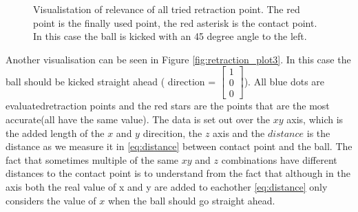 \documentclass[a4paper]{article}
\begin{document}
\begin{figure}[htbp]
  \centering
  \caption{Visualistation of relevance of all tried retraction point. The red
      point is the finally used point, the red asterisk is the contact point. 
      In this case the ball is kicked with an 45 degree angle to the left.
         }
  \label{fig:retraction_plot2}
\end{figure}

Another visualisation can be seen in Figure  \ref{fig:retraction_plot3}. In this
case the ball should be kicked straight ahead ( direction = $\begin{bmatrix} 1 \\  0 \\ 0 \end{bmatrix}$). All blue dots are evaluatedretraction points and the red stars are the points that are the most
accurate(all have the same value). The data is set out over the $xy$ axis, which
is the added length of the $x$ and $y$ direcition, the $z$ axis and the
$distance$ is the distance as we measure it in \ref{eq:distance}  between contact point and the ball. The fact that sometimes multiple of the same $xy$ and $z$
combinations have different distances to the contact point is to understand from
the fact that although in the axis both the real value of x and y are added to
eachother \ref{eq:distance} only considers the value of $x$ when the ball should go
straight ahead.
\end{document}
